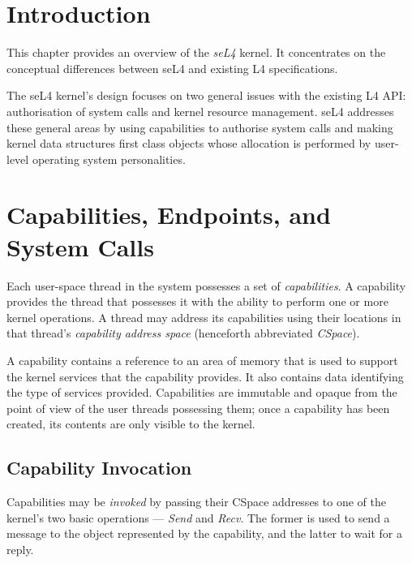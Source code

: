 %
%
%
%

\section{Introduction}\label{sec:overview.intro}

This chapter provides an overview of the \emph{seL4} kernel. It
concentrates on the conceptual differences between seL4 and existing
L4 specifications.

The seL4 kernel's design focuses on two general issues with the
existing L4 API: authorisation of system calls and kernel resource
management. seL4 addresses these general areas by using capabilities
to authorise system calls and making kernel data structures first
class objects whose allocation is performed by user-level operating
system personalities.

\section{Capabilities, Endpoints, and System Calls}\label{sec:overview.caps}

Each user-space thread in the system possesses a set of \emph{capabilities}. A
capability provides the thread that possesses it with the ability to perform one
or more kernel operations. A thread may address its capabilities using their
locations in that thread's \emph{capability address space} (henceforth
abbreviated \emph{CSpace}).

A capability contains a reference to an area of memory that is used to support
the kernel services that the capability provides. It also contains data
identifying the type of services provided. Capabilities are immutable and
opaque from the point of view of the user threads possessing them; once a
capability has been created, its contents are only visible to the kernel.

\subsection{Capability Invocation}

Capabilities may be \emph{invoked} by passing their CSpace addresses to one of
the kernel's two basic operations --- \emph{Send} and \emph{Recv}. The former
is used to send a message to the object represented by the capability, and the
latter to wait for a reply.

